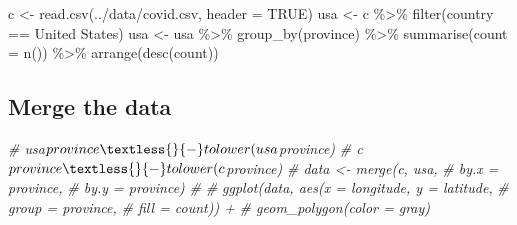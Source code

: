 \documentclass[
]{article}
\newenvironment{Shaded}{\begin{snugshade}}{\end{snugshade}}
\newcommand{\AttributeTok}[1]{\textcolor[rgb]{0.77,0.63,0.00}{#1}}
\newcommand{\CommentTok}[1]{\textcolor[rgb]{0.56,0.35,0.01}{\textit{#1}}}
\newcommand{\ConstantTok}[1]{\textcolor[rgb]{0.00,0.00,0.00}{#1}}
\newcommand{\FunctionTok}[1]{\textcolor[rgb]{0.00,0.00,0.00}{#1}}
\newcommand{\NormalTok}[1]{#1}
\newcommand{\OtherTok}[1]{\textcolor[rgb]{0.56,0.35,0.01}{#1}}
\newcommand{\SpecialCharTok}[1]{\textcolor[rgb]{0.00,0.00,0.00}{#1}}
\newcommand{\StringTok}[1]{\textcolor[rgb]{0.31,0.60,0.02}{#1}}
\begin{document}
\begin{Shaded}
\begin{Highlighting}[]
\NormalTok{c }\OtherTok{\textless{}{-}} \FunctionTok{read.csv}\NormalTok{(}\StringTok{\textquotesingle{}../data/covid.csv\textquotesingle{}}\NormalTok{, }\AttributeTok{header =} \ConstantTok{TRUE}\NormalTok{)}
\NormalTok{usa }\OtherTok{\textless{}{-}}\NormalTok{ c }\SpecialCharTok{\%\textgreater{}\%} \FunctionTok{filter}\NormalTok{(country }\SpecialCharTok{==} \StringTok{\textquotesingle{}United States\textquotesingle{}}\NormalTok{)}
\NormalTok{usa }\OtherTok{\textless{}{-}}\NormalTok{ usa }\SpecialCharTok{\%\textgreater{}\%} \FunctionTok{group\_by}\NormalTok{(province) }\SpecialCharTok{\%\textgreater{}\%} 
  \FunctionTok{summarise}\NormalTok{(}\AttributeTok{count =} \FunctionTok{n}\NormalTok{()) }\SpecialCharTok{\%\textgreater{}\%} 
  \FunctionTok{arrange}\NormalTok{(}\FunctionTok{desc}\NormalTok{(count))}
\end{Highlighting}
\end{Shaded}

\hypertarget{merge-the-data}{%
\subsection{Merge the data}\label{merge-the-data}}

\begin{Shaded}
\begin{Highlighting}[]
\CommentTok{\# usa$province \textless{}{-} tolower(usa$province)}
\CommentTok{\# c$province \textless{}{-} tolower(c$province)}
\CommentTok{\# data \textless{}{-} merge(c, usa,}
\CommentTok{\#               by.x = \textquotesingle{}province\textquotesingle{},}
\CommentTok{\#               by.y = \textquotesingle{}province\textquotesingle{})}
\CommentTok{\# }
\CommentTok{\# ggplot(data, aes(x = longitude, y = latitude, }
\CommentTok{\#                  group = province,}
\CommentTok{\#                  fill = count)) +}
\CommentTok{\#   geom\_polygon(color = \textquotesingle{}gray\textquotesingle{}) }
\end{Highlighting}
\end{Shaded}
\end{document}
